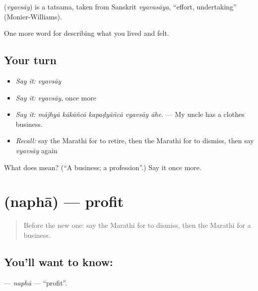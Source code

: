 \begin{cousinweb}
\textbf{} (\emph{vyavsāy}) is a tatsama, taken from Sanskrit \emph{vyavasāya}, \textquotedblleft{}effort, undertaking\textquotedblright{} (Monier-Williams).
\end{cousinweb}

\begin{grammarlens}[title={What you've built}]
One more word for describing what you lived and felt.
\end{grammarlens}

\subsection*{Your turn}
\begin{itemize}
\raggedright
  \item \emph{Say it:} \emph{vyavsāy}
  \item \emph{Say it:} \emph{vyavsāy}, once more
  \item \emph{Say it:} \emph{mājhyā kākāñcā kapaḍyāñcā vyavsāy āhe.} — My uncle has a clothes business.
  \item \emph{Recall:} say the Marathi for to retire, then the Marathi for to dismiss, then say \emph{vyavsāy} again
\end{itemize}

\begin{tcolorbox}[breakable,colback=teal!4,colframe=teal!35!black,title={Before you move on}]
What does  mean? (\textquotedblleft{}A business; a profession\textquotedblright{}.) Say it once more.
\end{tcolorbox}
\section[\texorpdfstring{\mr{नफा} (naphā)}{नफा (naphā)}]{ (naphā) — profit}

\label{lesson:MR-C511-napha}



\begin{quote}
Before the new one: say the Marathi for to dismiss, then the Marathi for a business.
\end{quote}

\subsection*{You'll want to know: }
\textbf{} — \emph{naphā} — \textquotedblleft{}profit\textquotedblright{}.

